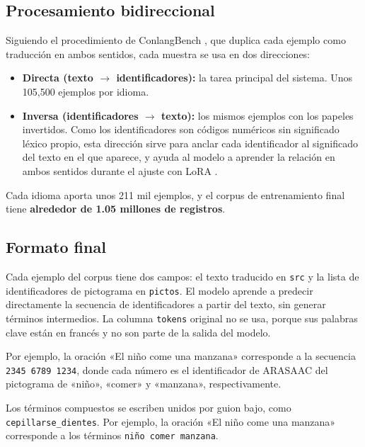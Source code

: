 \subsection{Procesamiento bidireccional}
Siguiendo el procedimiento de ConlangBench \citep{jeong_conlangbench_2026}, que duplica cada ejemplo como traducción en ambos sentidos, cada muestra se usa en dos direcciones:
\begin{itemize}
    \item \textbf{Directa (texto $\rightarrow$ identificadores):} la tarea principal del sistema. Unos 105,500 ejemplos por idioma.
    \item \textbf{Inversa (identificadores $\rightarrow$ texto):} los mismos ejemplos con los papeles invertidos. Como los identificadores son códigos numéricos sin significado léxico propio, esta dirección sirve para anclar cada identificador al significado del texto en el que aparece, y ayuda al modelo a aprender la relación en ambos sentidos durante el ajuste con LoRA \citep{hu2021lora}.
\end{itemize}
Cada idioma aporta unos 211 mil ejemplos, y el corpus de entrenamiento final tiene \textbf{alrededor de 1.05 millones de registros}.

\subsection{Formato final}
Cada ejemplo del corpus tiene dos campos: el texto traducido en \texttt{src} y la lista de identificadores de pictograma en \texttt{pictos}. El modelo aprende a predecir directamente la secuencia de identificadores a partir del texto, sin generar términos intermedios. La columna \texttt{tokens} original no se usa, porque sus palabras clave están en francés y no son parte de la salida del modelo.

Por ejemplo, la oración «El niño come una manzana» corresponde a la secuencia \texttt{2345 6789 1234}, donde cada número es el identificador de ARASAAC del pictograma de «niño», «comer» y «manzana», respectivamente.

Los términos compuestos se escriben unidos por guion bajo, como \texttt{cepillarse\_dientes}. Por ejemplo, la oración «El niño come una manzana» corresponde a los términos \texttt{niño comer manzana}.


